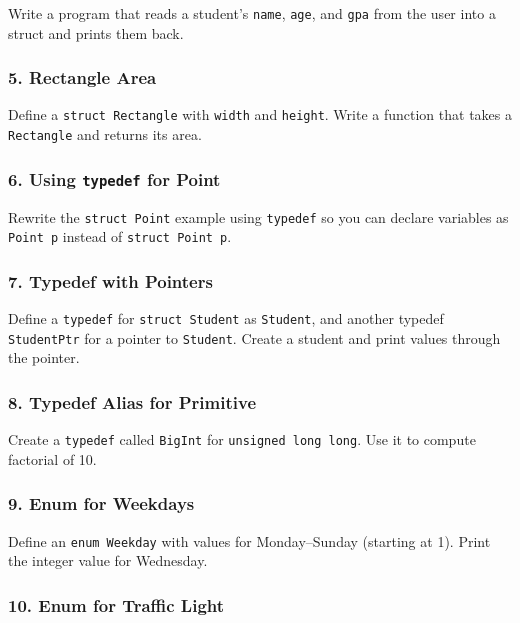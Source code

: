 \documentclass[
  letterpaper,
  DIV=11,
  numbers=noendperiod]{scrreprt}
\begin{document}
Write a program that reads a student's \texttt{name}, \texttt{age}, and
\texttt{gpa} from the user into a struct and prints them back.

\subsubsection{5. Rectangle Area}\label{rectangle-area}

Define a \texttt{struct\ Rectangle} with \texttt{width} and
\texttt{height}. Write a function that takes a \texttt{Rectangle} and
returns its area.

\subsubsection{\texorpdfstring{6. Using \texttt{typedef} for
Point}{6. Using typedef for Point}}\label{using-typedef-for-point}

Rewrite the \texttt{struct\ Point} example using \texttt{typedef} so you
can declare variables as \texttt{Point\ p} instead of
\texttt{struct\ Point\ p}.

\subsubsection{7. Typedef with Pointers}\label{typedef-with-pointers-1}

Define a \texttt{typedef} for \texttt{struct\ Student} as
\texttt{Student}, and another typedef \texttt{StudentPtr} for a pointer
to \texttt{Student}. Create a student and print values through the
pointer.

\subsubsection{8. Typedef Alias for
Primitive}\label{typedef-alias-for-primitive}

Create a \texttt{typedef} called \texttt{BigInt} for
\texttt{unsigned\ long\ long}. Use it to compute factorial of 10.

\subsubsection{9. Enum for Weekdays}\label{enum-for-weekdays}

Define an \texttt{enum\ Weekday} with values for Monday--Sunday
(starting at 1). Print the integer value for Wednesday.

\subsubsection{10. Enum for Traffic Light}\label{enum-for-traffic-light}
\end{document}
